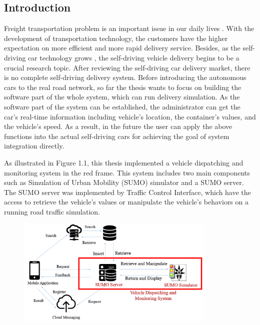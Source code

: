 \documentclass[12pt]{ksthesis}
\begin{document}
\begin{thesis}\large {
\chapter{Introduction} \label{Chap:Introduction}

Freight transportation problem is an important issue in our daily lives \cite{Anand2012} . With the development of transportation technology, the customers have the higher expectation on more efficient and more rapid delivery service. Besides, as the self-driving car technology grows \cite{Lutin2013}, the self-driving vehicle delivery begins to be a crucial research topic. After reviewing the self-driving car delivery market, there is no complete self-driving delivery system. 
Before introducing the autonomous cars to the real road network, so far the thesis wants to focus on building the software part of the whole system, which can run delivery simulation. As the software part of the system can be established, the administrator can get the car’s real-time information including vehicle’s location, the container’s values, and the vehicle’s speed. As a result, in the future the user can apply the above functions into the actual self-driving cars for achieving the goal of system integration directly.

As illustrated in Figure 1.1, this thesis implemented a vehicle dispatching and monitoring system in the red frame. This system includes two main components such as Simulation of Urban Mobility (SUMO) simulator and a SUMO server. The SUMO server was implemented by Traffic Control Interface, which have the access to retrieve the vehicle’s values or manipulate the vehicle’s behaviors on a running road traffic simulation.

\begin{figure}[t!]
\centering
\includegraphics[width=0.85\textwidth]{./Thesis_figures/F1-1_System_Design_Overview.PNG}


\end{figure}}
\end{thesis}
\end{document}
